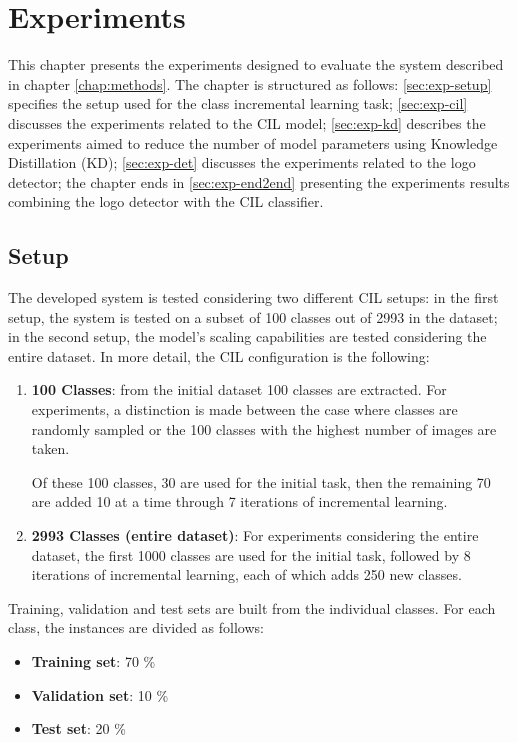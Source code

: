 \chapter{Experiments}
\label{chap:experiments}
This chapter presents the experiments designed to evaluate the system described in chapter \autoref{chap:methods}.
The chapter is structured as follows:
\autoref{sec:exp-setup} specifies the setup used for the class incremental learning task;
\autoref{sec:exp-cil} discusses the experiments related to the CIL model;
\autoref{sec:exp-kd} describes the experiments aimed to reduce the number of model parameters using Knowledge Distillation (KD);
\autoref{sec:exp-det} discusses the experiments related to the logo detector;
the chapter ends in \autoref{sec:exp-end2end} presenting the experiments results combining the logo detector with the CIL classifier.

\section{Setup}
\label{sec:exp-setup}
The developed system is tested considering two different CIL setups: in the first setup, the system is tested on a subset of 100 classes out of 2993 in the dataset; in the second setup, the model's scaling capabilities are tested considering the entire dataset.
In more detail, the CIL configuration is the following:
\begin{enumerate}
    \item \textbf{100 Classes}: from the initial dataset 100 classes are extracted. 
    For experiments, a distinction is made between the case where classes are randomly sampled or the 100 classes with the highest number of images are taken.
    
    Of these 100 classes, 30 are used for the initial task, then the remaining 70 are added 10 at a time through 7 iterations of incremental learning.

    \item \textbf{2993 Classes (entire dataset)}: For experiments considering the entire dataset, the first 1000 classes are used for the initial task, followed by 8 iterations of incremental learning, each of which adds 250 new classes.
\end{enumerate}

Training, validation and test sets are built from the individual classes. For each class, the instances are divided as follows:
\begin{itemize}
    \item \textbf{Training set}: 70 \%
    \item \textbf{Validation set}: 10 \%
    \item \textbf{Test set}: 20 \%
\end{itemize}


